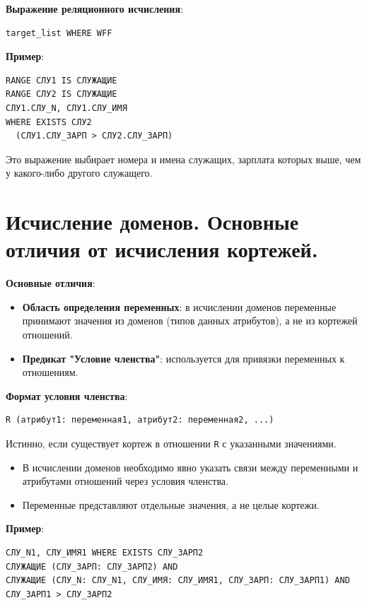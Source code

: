 \documentclass[a4paper,12pt]{article}
\begin{document}
\textbf{Выражение реляционного исчисления}:

\begin{verbatim}
target_list WHERE WFF
\end{verbatim}

\textbf{Пример}:

\begin{verbatim}
RANGE СЛУ1 IS СЛУЖАЩИЕ
RANGE СЛУ2 IS СЛУЖАЩИЕ
СЛУ1.СЛУ_N, СЛУ1.СЛУ_ИМЯ 
WHERE EXISTS СЛУ2
  (СЛУ1.СЛУ_ЗАРП > СЛУ2.СЛУ_ЗАРП)
\end{verbatim}

Это выражение выбирает номера и имена служащих, зарплата которых выше, чем у какого-либо другого служащего.

\section{Исчисление доменов. Основные отличия от исчисления кортежей.}

\textbf{Основные отличия}:

\begin{itemize}
    \item \textbf{Область определения переменных}: в исчислении доменов переменные принимают значения из доменов (типов данных атрибутов), а не из кортежей отношений.
    \item \textbf{Предикат "Условие членства"}: используется для привязки переменных к отношениям.
\end{itemize}


\textbf{Формат условия членства}:

\begin{verbatim}
R (атрибут1: переменная1, атрибут2: переменная2, ...)
\end{verbatim}

Истинно, если существует кортеж в отношении \texttt{R} с указанными значениями.


\begin{itemize}
    \item В исчислении доменов необходимо явно указать связи между переменными и атрибутами отношений через условия членства.
    \item Переменные представляют отдельные значения, а не целые кортежи.
\end{itemize}


\textbf{Пример}:

\begin{verbatim}
СЛУ_N1, СЛУ_ИМЯ1 WHERE EXISTS СЛУ_ЗАРП2
СЛУЖАЩИЕ (СЛУ_ЗАРП: СЛУ_ЗАРП2) AND
СЛУЖАЩИЕ (СЛУ_N: СЛУ_N1, СЛУ_ИМЯ: СЛУ_ИМЯ1, СЛУ_ЗАРП: СЛУ_ЗАРП1) AND
СЛУ_ЗАРП1 > СЛУ_ЗАРП2
\end{verbatim}
\end{document}
